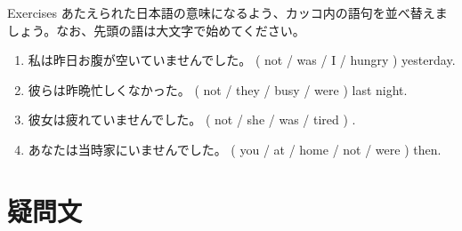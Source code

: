 \documentclass[aspectratio=169,xcolor={dvipsnames,table}]{beamer}
\newcommand{\myaudio}[1]{\href{#1}{\faVolumeUp}}
\begin{document}
\begin{frame}[plain]{Exercises}
あたえられた日本語の意味になるよう、カッコ内の語句を並べ替えましょう。なお、先頭の語は大文字で始めてください。 

\begin{enumerate}
 \item 私は昨日お腹が空いていませんでした。
( not / was / I / hungry ) yesterday.\\
 \item 
彼らは昨晩忙しくなかった。
( not / they / busy / were ) last night.\\
 \item 
彼女は疲れていませんでした。
( not / she / was / tired ) .\\
 \item 
あなたは当時家にいませんでした。
( you / at / home / not / were ) then.\\
\end{enumerate}

\hfill\myaudio{./audio/024_past_be_05.mp3}

\end{frame}


\section{疑問文}
\end{document}
